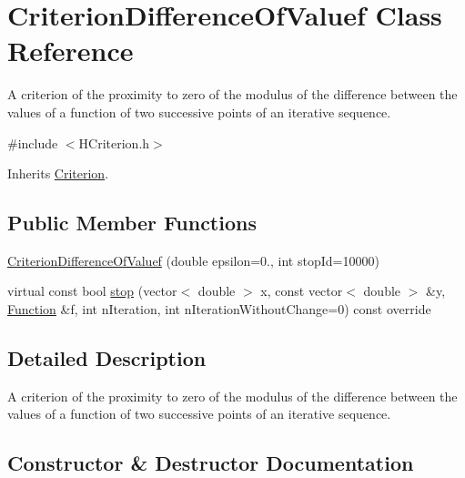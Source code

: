 \hypertarget{class_criterion_difference_of_valuef}{}\section{Criterion\+Difference\+Of\+Valuef Class Reference}
\label{class_criterion_difference_of_valuef}


A criterion of the proximity to zero of the modulus of the difference between the values of a function of two successive points of an iterative sequence.  




{\ttfamily \#include $<$H\+Criterion.\+h$>$}



Inherits \hyperlink{class_criterion}{Criterion}.

\subsection*{Public Member Functions}
\begin{DoxyCompactItemize}
\item 
\hyperlink{class_criterion_difference_of_valuef_a52ce39fff405f599054646eb47591780}{Criterion\+Difference\+Of\+Valuef} (double epsilon=0., int stop\+Id=10000)
\item 
virtual const bool \hyperlink{class_criterion_difference_of_valuef_afd9664b09456be745efd44d1577d26b1}{stop} (vector$<$ double $>$ x, const vector$<$ double $>$ \&y, \hyperlink{class_function}{Function} \&f, int n\+Iteration, int n\+Iteration\+Without\+Change=0) const override
\end{DoxyCompactItemize}


\subsection{Detailed Description}
A criterion of the proximity to zero of the modulus of the difference between the values of a function of two successive points of an iterative sequence. 

\subsection{Constructor \& Destructor Documentation}
\mbox{\label{class_criterion_difference_of_valuef_a52ce39fff405f599054646eb47591780}} 
